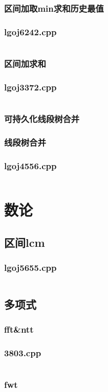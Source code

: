 \documentclass[a4paper,landscape,twocolumn]{article} %
\begin{document}
\subsubsection{区间加取min求和历史最值}
\subsubsection{lgoj6242.cpp}
\inputminted{c++}{./codes/050}
\subsubsection{区间加求和}
\subsubsection{lgoj3372.cpp}
\inputminted{c++}{./codes/051}
\subsubsection{可持久化线段树合并}
\subsubsection{线段树合并}
\subsubsection{lgoj4556.cpp}
\inputminted{c++}{./codes/052}
\section{数论}
\subsection{区间lcm}
\subsubsection{lgoj5655.cpp}
\inputminted{c++}{./codes/053}
\subsection{多项式}
\subsubsection{fft&ntt}
\subsubsection{3803.cpp}
\inputminted{c++}{./codes/054}
\subsubsection{fwt}
\end{document}
